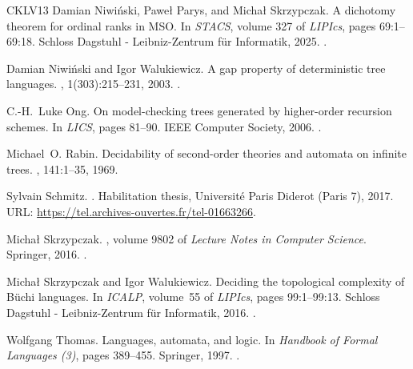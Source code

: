 \documentclass[11pt,a4paper]{amsart}
\theoremstyle{plain}
\theoremstyle{definition}
\theoremstyle{defC}
\theoremstyle{thmC}
\theoremstyle{plain}
\numberwithin{equation}{section}
\numberwithin{equation}{section}
\numberwithin{figure}{section}
\begin{document}
\begin{thebibliography}{CKLV13}
Damian Niwiński, Paweł Parys, and Michał Skrzypczak.
\newblock A dichotomy theorem for ordinal ranks in {MSO}.
\newblock In {\em {STACS}}, volume 327 of {\em LIPIcs}, pages 69:1--69:18.
  Schloss Dagstuhl - Leibniz-Zentrum f{\"{u}}r Informatik, 2025.
\newblock \href {https://doi.org/10.4230/LIPICS.STACS.2025.69}
  {}.

Damian Niwi{\'{n}}ski and Igor Walukiewicz.
\newblock A gap property of deterministic tree languages.
, 1(303):215--231, 2003.
\newblock \href {https://doi.org/10.1016/S0304-3975(02)00452-8}
  {}.

C.{-}H.~Luke Ong.
\newblock On model-checking trees generated by higher-order recursion schemes.
\newblock In {\em LICS}, pages 81--90. {IEEE} Computer Society, 2006.
\newblock \href {https://doi.org/10.1109/LICS.2006.38}
  {}.

Michael~O. Rabin.
\newblock Decidability of second-order theories and automata on infinite trees.
, 141:1--35,
  1969.

Sylvain Schmitz.
.
\newblock Habilitation thesis, Université Paris Diderot (Paris 7), 2017.
\newblock URL: \url{https://tel.archives-ouvertes.fr/tel-01663266}.

Micha{\l} Skrzypczak.
, volume 9802 of {\em Lecture Notes
  in Computer Science}.
\newblock Springer, 2016.
\newblock \href {https://doi.org/10.1007/978-3-662-52947-8}
  {}.

Micha{\l} Skrzypczak and Igor Walukiewicz.
\newblock Deciding the topological complexity of {B}{\"{u}}chi languages.
\newblock In {\em {ICALP}}, volume~55 of {\em LIPIcs}, pages 99:1--99:13.
  Schloss Dagstuhl - Leibniz-Zentrum f{\"{u}}r Informatik, 2016.
\newblock \href {https://doi.org/10.4230/LIPICS.ICALP.2016.99}
  {}.

Wolfgang Thomas.
\newblock Languages, automata, and logic.
\newblock In {\em Handbook of Formal Languages {(3)}}, pages 389--455.
  Springer, 1997.
\newblock \href {https://doi.org/10.1007/978-3-642-59126-6_7}
  {}.

\end{thebibliography}
\end{document}
